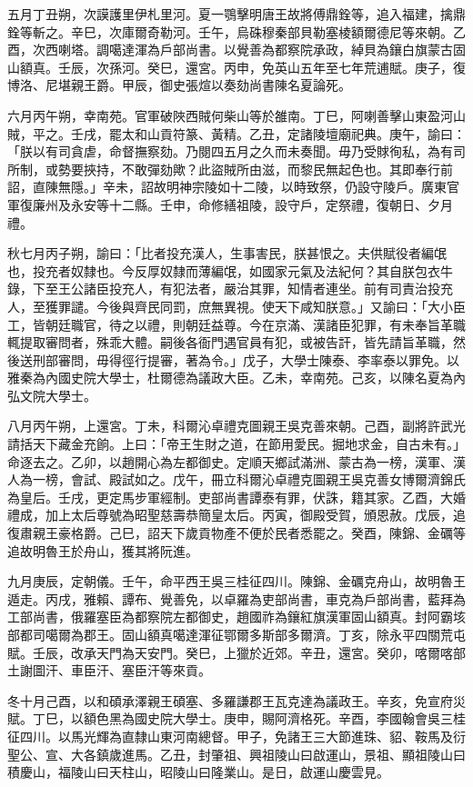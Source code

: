 \begin{pinyinscope}
五月丁丑朔，次謨護里伊札里河。夏一鶚擊明唐王故將傅鼎銓等，追入福建，擒鼎銓等斬之。辛巳，次庫爾奇勒河。壬午，烏硃穆秦部貝勒塞棱額爾德尼等來朝。乙酉，次西喇塔。調噶達渾為戶部尚書。以覺善為都察院承政，綽貝為鑲白旗蒙古固山額真。壬辰，次孫河。癸巳，還宮。丙申，免英山五年至七年荒逋賦。庚子，復博洛、尼堪親王爵。甲辰，御史張煊以奏劾尚書陳名夏論死。

六月丙午朔，幸南苑。官軍破陜西賊何柴山等於雒南。丁巳，阿喇善擊山東盈河山賊，平之。壬戌，罷太和山貢符篆、黃精。乙丑，定諸陵壇廟祀典。庚午，諭曰：「朕以有司貪虐，命督撫察劾。乃閱四五月之久而未奏聞。毋乃受賕徇私，為有司所制，或勢要挾持，不敢彈劾歟？此盜賊所由滋，而黎民無起色也。其即奉行前詔，直陳無隱。」辛未，詔故明神宗陵如十二陵，以時致祭，仍設守陵戶。廣東官軍復廉州及永安等十二縣。壬申，命修繕祖陵，設守戶，定祭禮，復朝日、夕月禮。

秋七月丙子朔，諭曰：「比者投充漢人，生事害民，朕甚恨之。夫供賦役者編氓也，投充者奴隸也。今反厚奴隸而薄編氓，如國家元氣及法紀何？其自朕包衣牛錄，下至王公諸臣投充人，有犯法者，嚴治其罪，知情者連坐。前有司責治投充人，至獲罪譴。今後與齊民同罰，庶無異視。使天下咸知朕意。」又諭曰：「大小臣工，皆朝廷職官，待之以禮，則朝廷益尊。今在京滿、漢諸臣犯罪，有未奉旨革職輒提取審問者，殊乖大體。嗣後各衙門遇官員有犯，或被告訐，皆先請旨革職，然後送刑部審問，毋得徑行提審，著為令。」戊子，大學士陳泰、李率泰以罪免。以雅秦為內國史院大學士，杜爾德為議政大臣。乙未，幸南苑。己亥，以陳名夏為內弘文院大學士。

八月丙午朔，上還宮。丁未，科爾沁卓禮克圖親王吳克善來朝。己酉，副將許武光請括天下藏金充餉。上曰：「帝王生財之道，在節用愛民。掘地求金，自古未有。」命逐去之。乙卯，以趙開心為左都御史。定順天鄉試滿洲、蒙古為一榜，漢軍、漢人為一榜，會試、殿試如之。戊午，冊立科爾沁卓禮克圖親王吳克善女博爾濟錦氏為皇后。壬戌，更定馬步軍經制。吏部尚書譚泰有罪，伏誅，籍其家。乙酉，大婚禮成，加上太后尊號為昭聖慈壽恭簡皇太后。丙寅，御殿受賀，頒恩赦。戊辰，追復肅親王豪格爵。己巳，詔天下歲貢物產不便於民者悉罷之。癸酉，陳錦、金礪等追故明魯王於舟山，獲其將阮進。

九月庚辰，定朝儀。壬午，命平西王吳三桂征四川。陳錦、金礪克舟山，故明魯王遁走。丙戌，雅賴、譚布、覺善免，以卓羅為吏部尚書，車克為戶部尚書，藍拜為工部尚書，俄羅塞臣為都察院左都御史，趙國祚為鑲紅旗漢軍固山額真。封阿霸垓部都司噶爾為郡王。固山額真噶達渾征鄂爾多斯部多爾濟。丁亥，除永平四關荒屯賦。壬辰，改承天門為天安門。癸巳，上獵於近郊。辛丑，還宮。癸卯，喀爾喀部土謝圖汗、車臣汗、塞臣汗等來貢。

冬十月己酉，以和碩承澤親王碩塞、多羅謙郡王瓦克達為議政王。辛亥，免宣府災賦。丁巳，以額色黑為國史院大學士。庚申，賜阿濟格死。辛酉，李國翰會吳三桂征四川。以馬光輝為直隸山東河南總督。甲子，免諸王三大節進珠、貂、鞍馬及衍聖公、宣、大各鎮歲進馬。乙丑，封肇祖、興祖陵山曰啟運山，景祖、顯祖陵山曰積慶山，福陵山曰天柱山，昭陵山曰隆業山。是日，啟運山慶雲見。


\end{pinyinscope}
